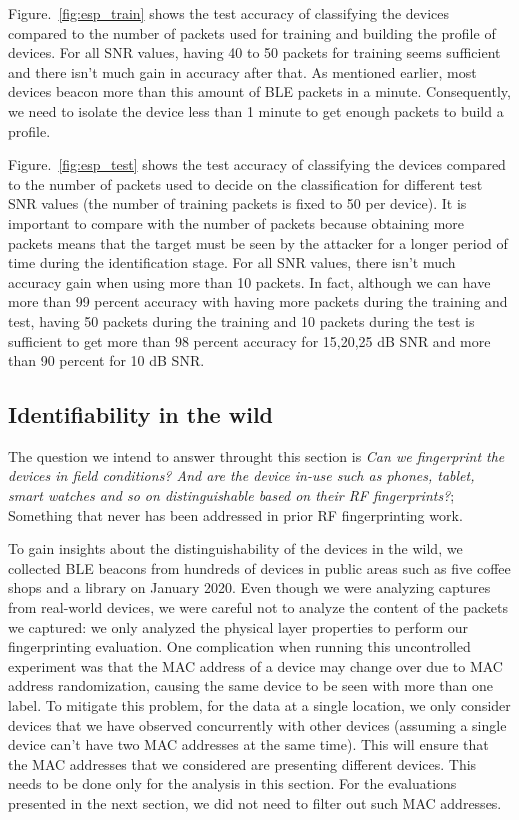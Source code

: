 Figure.~\ref{fig:esp_train} shows the test accuracy of classifying the devices compared to the number of packets used for training and building the profile of devices. For all SNR values, having 40 to 50 packets for training seems sufficient and there isn't much gain in accuracy after that. As mentioned earlier, most devices beacon more than this amount of BLE packets in a minute. Consequently, we need to isolate the device less than 1 minute to get enough packets to build a profile. 

Figure.~\ref{fig:esp_test} shows the test accuracy of classifying the devices compared to the number of packets used to decide on the classification for different test SNR values (the number of training packets is fixed to 50 per device). It is important to compare with the number of packets because obtaining more packets means that the target must be seen by the attacker for a longer period of time during the identification stage. For all SNR values, there isn't much accuracy gain when using more than 10 packets. In fact, although we can have more than 99 percent accuracy with having more packets during the training and test, having 50 packets during the training and 10 packets during the test is sufficient to get more than 98 percent accuracy for 15,20,25 dB SNR and more than 90 percent for 10 dB SNR.



\subsection{Identifiability in the wild}
\label{sec:results:field}

The question we intend to answer throught this section is \textit{Can we fingerprint the devices in field conditions? And are the device in-use such as phones, tablet, smart watches and so on distinguishable based on their RF fingerprints?}; Something that never has been addressed in prior RF fingerprinting work. 

To gain insights about the distinguishability of the devices in the wild, we collected BLE beacons from hundreds of devices in public areas such as five coffee shops and a library on January 2020. Even though we were analyzing captures from real-world devices, we were careful not to analyze the content of the packets we captured: we only analyzed the physical layer properties to perform our fingerprinting evaluation. %
One complication when running this uncontrolled experiment was that the MAC address of a device may change over due to MAC address randomization, causing the same device to be seen with more than one label. To mitigate this problem, for the data at a single location, we only consider devices that we have observed concurrently with other devices (assuming a single device can't have two MAC addresses at the same time). This will ensure that the MAC addresses that we considered are presenting different devices. This needs to be done only for the analysis in this section. For the evaluations presented in the next section, we did not need to filter out such MAC addresses.


